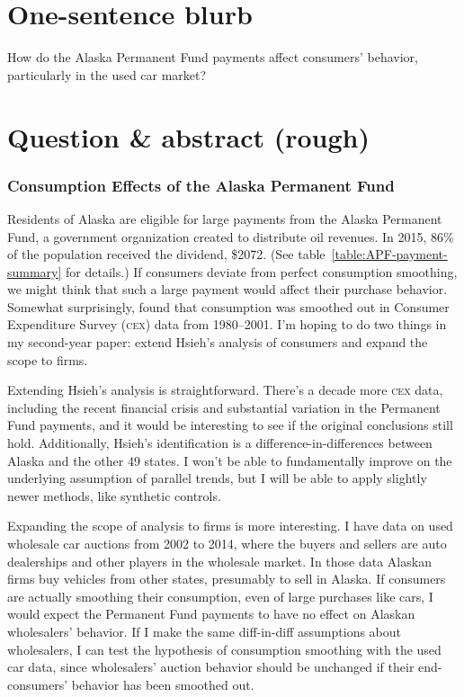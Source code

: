 \documentclass[11pt,letterpaper,oneside]{article}
\newcommand{\cex}{\textsc{cex}}
\begin{document}
\part{One-sentence blurb}
How do the Alaska Permanent Fund payments affect consumers' behavior, particularly in the used car market?


\part{Question \& abstract (rough)}
\section{Consumption Effects of the Alaska Permanent Fund}
\noindent Residents of Alaska are eligible for large payments from the Alaska Permanent Fund, a government organization created to distribute oil revenues.
In 2015, 86\% of the population received the dividend, \$2072. (See table~\ref{table:APF-payment-summary} for details.)
If consumers deviate from perfect consumption smoothing, we might think that such a large payment would affect their purchase behavior.
Somewhat surprisingly, \textcite{hsieh2003} found that consumption was smoothed out in Consumer Expenditure Survey (\cex) data from 1980--2001.
I'm hoping to do two things in my second-year paper: extend Hsieh's analysis of consumers and expand the scope to firms.

Extending Hsieh's analysis is straightforward.
There's a decade more \cex{} data, including the recent financial crisis and substantial variation in the Permanent Fund payments, and it would be interesting to see if the original conclusions still hold.
Additionally, Hsieh's identification is a difference-in-differences between Alaska and the other 49 states.
I won't be able to fundamentally improve  %
on the underlying assumption of parallel trends, but I will be able to apply slightly newer methods, like synthetic controls.

Expanding the scope of analysis to firms is more interesting.
I have data on used wholesale car auctions from 2002 to 2014, where the buyers and sellers are auto dealerships and other players in the wholesale market.
In those data Alaskan firms buy vehicles from other states, presumably to sell in Alaska.
If consumers are actually smoothing their consumption, even of large purchases like cars, I would expect the Permanent Fund payments to have no effect on Alaskan wholesalers' behavior.
If I make the same diff-in-diff assumptions about wholesalers, I can test the hypothesis of consumption smoothing with the used car data, since wholesalers' auction behavior should be unchanged if their end-consumers' behavior has been smoothed out.
\end{document}
